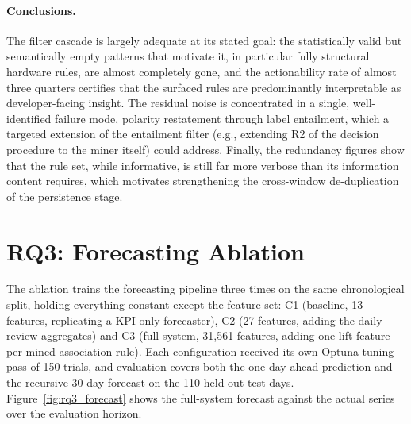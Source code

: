 \paragraph{Conclusions.} The filter cascade is largely adequate at its stated goal: the statistically valid but semantically empty patterns that motivate it, in particular fully structural hardware rules, are almost completely gone, and the actionability rate of almost three quarters certifies that the surfaced rules are predominantly interpretable as developer-facing insight. The residual noise is concentrated in a single, well-identified failure mode, polarity restatement through label entailment, which a targeted extension of the entailment filter (e.g., extending R2 of the decision procedure to the miner itself) could address. Finally, the redundancy figures show that the rule set, while informative, is still far more verbose than its information content requires, which motivates strengthening the cross-window de-duplication of the persistence stage.


\section{RQ3: Forecasting Ablation}
\label{sec:rq3_results}

\noindent The ablation trains the forecasting pipeline three times on the same chronological split, holding everything constant except the feature set: C1 (baseline, 13 features, replicating a KPI-only forecaster), C2 (27 features, adding the daily review aggregates) and C3 (full system, 31{,}561 features, adding one lift feature per mined association rule). Each configuration received its own Optuna tuning pass of 150 trials, and evaluation covers both the one-day-ahead prediction and the recursive 30-day forecast on the 110 held-out test days. Figure~\ref{fig:rq3_forecast} shows the full-system forecast against the actual series over the evaluation horizon.

